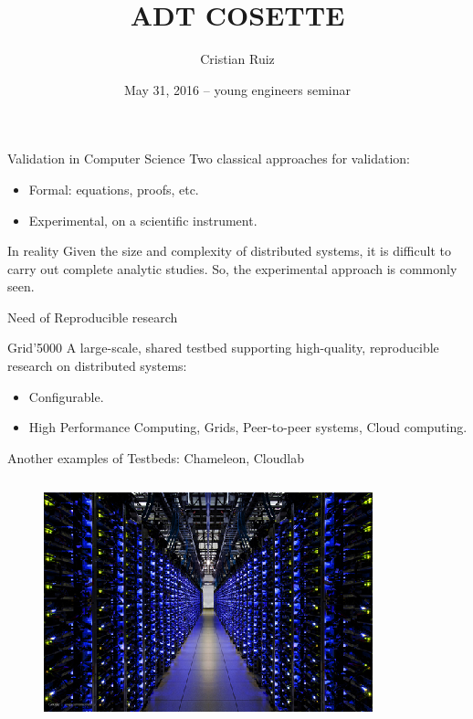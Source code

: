 \documentclass[11pt,xcolor=dvipsnames,presentation]{beamer}
\author{Cristian Ruiz}
\date{May 31, 2016 --  young engineers seminar \mylogos}
\title{ADT COSETTE}
\begin{document}
\maketitle


\section{}
\label{sec-1}
\begin{frame}[label=sec-1-0-1]{Validation in Computer Science}
Two classical approaches for validation:

\begin{itemize}
\item \alert{Formal:} equations, proofs, etc.
\item \alert{Experimental}, on a scientific instrument.
\end{itemize}

\begin{block}{In reality}
Given the size and complexity of distributed systems,
it is difficult to carry out complete analytic studies.
\alert{So, the experimental approach is commonly seen}.
\end{block}

\begin{block}{Need of}
\alert{Reproducible research}
\end{block}
\end{frame}

\begin{frame}[label=sec-1-0-2]{Grid'5000}
A large-scale, shared testbed supporting high-quality,
reproducible research on distributed systems:

\begin{itemize}
\item Configurable.
\item High Performance Computing, Grids, Peer-to-peer systems, Cloud computing.
\end{itemize}

Another examples of Testbeds: Chameleon, Cloudlab
\begin{columns}
\begin{column}{0.5\textwidth}

\begin{figure}[!h]
  \center
  \includegraphics[scale=0.33]{figures/hpc.png}
  \label{fig:hpc}
\end{figure}
\end{column}
\end{columns}
\end{frame}
\end{document}
